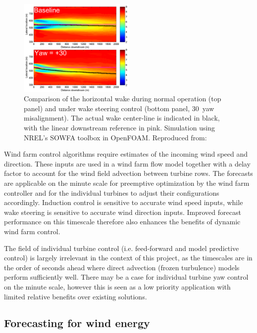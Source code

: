 \begin{figure}[htbp]
    \centering
        \includegraphics[width=0.5\textwidth]{graphics/intro/wake_steering.png}
    \caption{Comparison of the horizontal wake during normal operation (top panel) and under wake steering control (bottom panel, 30\degree \ yaw misalignment). The actual wake center-line is indicated in black, with the linear downstream reference in pink. Simulation using NREL's SOWFA toolbox in OpenFOAM. Reproduced from: \cite{fleming_wakesteering_2014}}
    \label{fig:wake_steering}
\end{figure}

Wind farm control algorithms require estimates of the incoming wind speed and direction. These inputs are used in a wind farm flow model together with a delay factor to account for the wind field advection between turbine rows. The forecasts are applicable on the minute scale for preemptive optimization by the wind farm controller and for the individual turbines to adjust their configurations accordingly. Induction control is sensitive to accurate wind speed inputs, while wake steering is sensitive to accurate wind direction inputs. Improved forecast performance on this timescale therefore also enhances the benefits of dynamic wind farm control.

The field of individual turbine control (i.e. feed-forward and model predictive control) is largely irrelevant in the context of this project, as the timescales are in the order of seconds ahead where direct advection (frozen turbulence) models perform sufficiently well. There may be a case for individual turbine yaw control on the minute scale, however this is seen as a low priority application with limited relative benefits over existing solutions.

\clearpage
\subsection{Forecasting for wind energy}
\label{sec:intro_forecasting}

